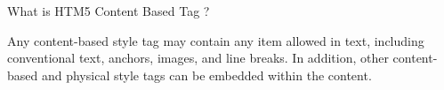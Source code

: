 What is HTM5 Content Based Tag ?

Any content-based style tag may contain any item allowed in text, including
conventional text, anchors, images, and line breaks. In addition,
other content-based and physical style tags can be embedded within the content.
